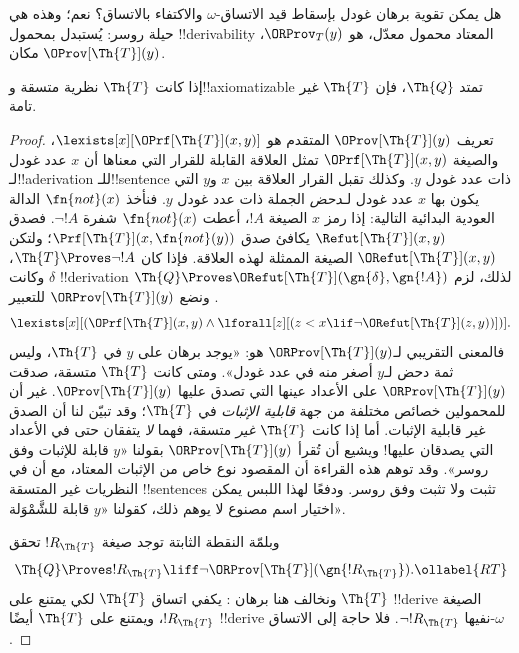 \documentclass[../../../include/open-logic-section]{subfiles}
\begin{document}


هل يمكن تقوية برهان غودل بإسقاط قيد الاتساق-$\omega$ والاكتفاء
بالاتساق؟ نعم؛ وهذه هي حيلة روسر: يُستبدل بمحمول
!!{derivability} المعتاد محمول معدّل، هو $\ORProv_T(y)$،
مكان $\OProv[\Th{T}](y)$.

\begin{thm}
إذا كانت $\Th{T}$ نظرية متسقة و!!{axiomatizable} تمتد $\Th{Q}$،
فإن $\Th{T}$ غير تامة.
\end{thm}

\begin{proof}
تعريف $\OProv[\Th{T}](y)$ المتقدم هو
$\lexists[x][\OPrf[\Th{T}](x,y)]$، والصيغة
$\OPrf[\Th{T}](x,y)$ تمثل العلاقة القابلة للقرار التي معناها أن
$x$ عدد غودل لـ!!a{derivation} للـ!!{sentence} ذات عدد غودل $y$.
وكذلك تقبل القرار العلاقة بين $x$ و$y$ التي يكون بها $x$ عدد غودل
لـ\emph{دحض} الجملة ذات عدد غودل $y$. فنأخذ $\fn{not}(x)$
الدالة العودية البدائية التالية: إذا رمز $x$ الصيغة $!A$،
أعطت $\fn{not}(x)$ شفرة $\lnot !A$. فصدق
$\Refut[\Th{T}](x,y)$ يكافئ صدق
$\Prf[\Th{T}](x,\fn{not}(y))$؛ ولتكن
$\ORefut[\Th{T}](x,y)$ الصيغة الممثلة لهذه العلاقة.
فإذا كان $\Th{T}\Proves\lnot !A$، وكانت $\delta$
!!{derivation} لذلك، لزم
$\Th{Q}\Proves\ORefut[\Th{T}](\gn{\delta},\gn{!A})$.
ونضع $\ORProv[\Th{T}](y)$ للتعبير
\[
\lexists[x][(\OPrf[\Th{T}](x,y) \land \lforall[z][(z < x \lif \lnot
  \ORefut[\Th{T}](z,y))])].
\]
فالمعنى التقريبي لـ$\ORProv[\Th{T}](y)$ هو: «يوجد برهان على $y$
في $\Th{T}$، وليس ثمة دحض لـ$y$ أصغر منه في عدد غودل».
ومتى كانت $\Th{T}$ متسقة، صدقت $\ORProv[\Th{T}](y)$ على
الأعداد عينها التي تصدق عليها $\OProv[\Th{T}](y)$.
غير أن للمحمولين خصائص مختلفة من جهة \emph{قابلية الإثبات}
في $\Th{T}$؛ وقد تبيّن لنا أن الصدق غير قابلية الإثبات.
أما إذا كانت $\Th{T}$ \emph{غير} متسقة، فهما \emph{لا} يتفقان
حتى في الأعداد التي يصدقان عليها!{} ويشيع أن تُقرأ
$\ORProv[\Th{T}](y)$ بقولنا «$y$ قابلة للإثبات وفق روسر».
وقد توهم هذه القراءة أن المقصود نوع خاص من الإثبات المعتاد،
مع أن في النظريات غير المتسقة !!{sentence}s تثبت ولا تثبت وفق
روسر. ودفعًا لهذا اللبس يمكن اختيار اسم مصنوع لا يوهم ذلك،
كقولنا «$y$ قابلة للشَّمْوَلة».

وبلمّة النقطة الثابتة توجد صيغة $!R_\Th{T}$ تحقق
\begin{equation}
  \Th{Q} \Proves !R_\Th{T} \liff \lnot \ORProv[\Th{T}](\gn{!R_\Th{T}}).
  \ollabel{RT}
\end{equation}
ونخالف هنا برهان :
يكفي اتساق $\Th{T}$ لكي يمتنع على $\Th{T}$ !!{derive} الصيغة
$!R_\Th{T}$، ويمتنع على $\Th{T}$ أيضًا !!{derive} نفيها
$\lnot !R_\Th{T}$. فلا حاجة إلى الاتساق-$\omega$.


\end{proof}
\end{document}
